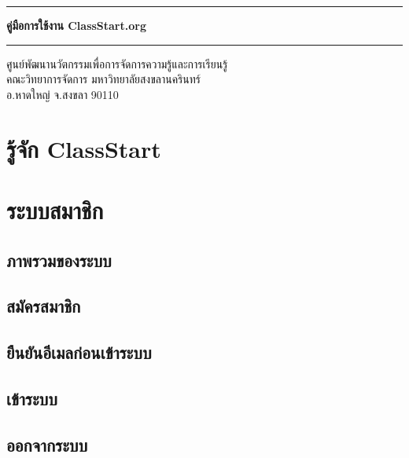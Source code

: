 \documentclass[12pt,oneside]{book}
\begin{document}
\begin{titlepage}

\begin{center}

\hrule

\vspace{1in}

\LARGE
\textbf{คู่มือการใช้งาน ClassStart.org}

\vspace{1in}

\hrule

\vfill

\large
ศูนย์พัฒนานวัตกรรมเพื่อการจัดการความรู้และการเรียนรู้\\
คณะวิทยาการจัดการ มหาวิทยาลัยสงขลานครินทร์\\
อ.หาดใหญ่ จ.สงขลา 90110

\end{center}

\end{titlepage}

\tableofcontents
\clearpage
\setcounter{page}{1}

\chapter{รู้จัก ClassStart}

\chapter{ระบบสมาชิก}

\section{ภาพรวมของระบบ}

\section{สมัครสมาชิก}

\section{ยืนยันอีเมลก่อนเข้าระบบ}

\section{เข้าระบบ}

\section{ออกจากระบบ}
\end{document}
